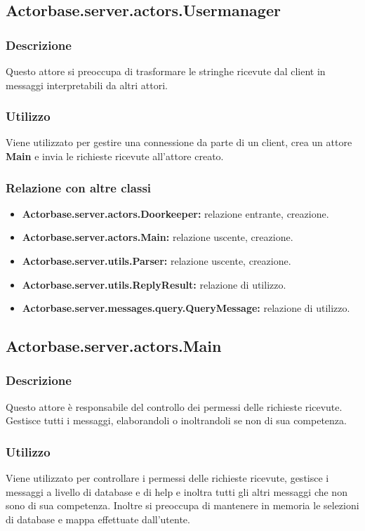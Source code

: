 \documentclass[a4paper]{article}
\begin{document}
		\subsection{Actorbase.server.actors.Usermanager}
			\subsubsection{Descrizione}
				Questo attore si preoccupa di trasformare le stringhe ricevute dal client in messaggi interpretabili da altri attori.
				
			\subsubsection{Utilizzo}
				Viene utilizzato per gestire una connessione da parte di un client, crea un attore \textbf{Main} e invia le richieste 
				ricevute all'attore creato. 
				
			\subsubsection{Relazione con altre classi}
				\begin{itemize}
					\item \textbf{Actorbase.server.actors.Doorkeeper:} relazione entrante, creazione.
					\item \textbf{Actorbase.server.actors.Main:} relazione uscente, creazione.
					\item \textbf{Actorbase.server.utils.Parser:} relazione uscente, creazione.
					\item \textbf{Actorbase.server.utils.ReplyResult:} relazione di utilizzo.
					\item \textbf{Actorbase.server.messages.query.QueryMessage:} relazione di utilizzo.
				\end{itemize}
				
		\subsection{Actorbase.server.actors.Main}
			\subsubsection{Descrizione}
				Questo attore è responsabile del controllo dei permessi delle richieste ricevute. Gestisce tutti i messaggi, elaborandoli o inoltrandoli 
				se non di sua competenza.
				
			\subsubsection{Utilizzo}
				Viene utilizzato per controllare i permessi delle richieste ricevute, gestisce i messaggi a livello di database e di help
				 e inoltra tutti gli altri messaggi che non sono di sua competenza. Inoltre si preoccupa di mantenere in memoria le selezioni di 
				 database e mappa effettuate dall'utente.
				
\end{document}
